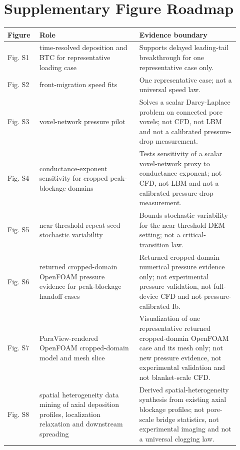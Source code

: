 \documentclass[11pt]{article}
\begin{document}
\section*{Supplementary Figure Roadmap}
\begin{longtable}{P{0.12\linewidth}P{0.40\linewidth}P{0.40\linewidth}}
\toprule
Figure & Role & Evidence boundary \\
\midrule
\endhead
Fig. S1 & time-resolved deposition and BTC for representative loading case & Supports delayed leading-tail breakthrough for one representative case only. \\
Fig. S2 & front-migration speed fits & One representative case; not a universal speed law. \\
Fig. S3 & voxel-network pressure pilot & Solves a scalar Darcy-Laplace problem on connected pore voxels; not CFD, not LBM and not a calibrated pressure-drop measurement. \\
Fig. S4 & conductance-exponent sensitivity for cropped peak-blockage domains & Tests sensitivity of a scalar voxel-network proxy to conductance exponent; not CFD, not LBM and not a calibrated pressure-drop measurement. \\
Fig. S5 & near-threshold repeat-seed stochastic variability & Bounds stochastic variability for the near-threshold DEM setting; not a critical-transition law. \\
Fig. S6 & returned cropped-domain OpenFOAM pressure evidence for peak-blockage handoff cases & Returned cropped-domain numerical pressure evidence only; not experimental pressure validation, not full-device CFD and not pressure-calibrated Ib. \\
Fig. S7 & ParaView-rendered OpenFOAM cropped-domain model and mesh slice & Visualization of one representative returned cropped-domain OpenFOAM case and its mesh only; not new pressure evidence, not experimental validation and not blanket-scale CFD. \\
Fig. S8 & spatial heterogeneity data mining of axial deposition profiles, localization relaxation and downstream spreading & Derived spatial-heterogeneity synthesis from existing axial blockage profiles; not pore-scale bridge statistics, not experimental imaging and not a universal clogging law. \\
\bottomrule
\end{longtable}
\clearpage
\end{document}
